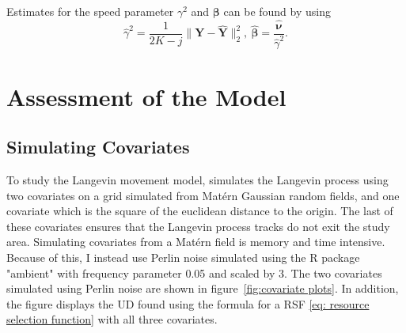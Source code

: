 Estimates for the speed parameter $\gamma^2$ and $\bm{\beta}$ can be found by using
$$
\hat{\gamma}^2 = \frac{1}{2K-j} \lVert \mathbf{Y} - \mathbf{\hat{Y}} \rVert^2_2, \ 
\bm{\hat{\beta}} = \frac{\bm{\hat{\nu}}}{\hat{\gamma}^2}.
\label{eq: michelot estimates}
$$



\section{Assessment of the Model}

\subsection{Simulating Covariates}
To study the Langevin movement model, \parencite{michelot_langevin_2019} simulates the Langevin process using two covariates on a grid simulated from  Matérn Gaussian random fields, and one covariate which is the square of the euclidean distance to the origin. The last of these covariates ensures that the Langevin process tracks do not exit the study area. Simulating covariates from a Matérn field is memory and time intensive. Because of this, I instead use Perlin noise simulated using the R package "ambient" with frequency parameter 0.05 and scaled by 3. The two covariates simulated using Perlin noise are shown in figure~\ref{fig:covariate plots}. In addition, the figure displays the UD found using the formula for a RSF \eqref{eq: resource selection function} with all three covariates.

